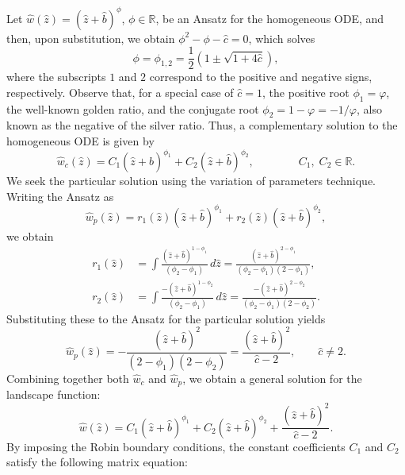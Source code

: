 \documentclass[symmetry,article,accept,moreauthors,pdftex,a4paper]{mdpi}
\begin{document}
\begin{paracol}{2}
Let $\widehat{w}(\widehat{z}) = (\widehat{z} + \widehat{b})^{\phi}$, $\phi \in \mathbb{R}$, be an Ansatz for the homogeneous ODE, and then, upon substitution, we obtain $\phi^2 - \phi - \widehat{c} = 0$, which solves
\begin{equation*}
\phi = \phi_{1,2} = \frac{1}{2} \left(1 \pm \sqrt{1 + 4 \widehat{c}} \right),
\end{equation*}
where the subscripts $1$ and $2$ correspond to the positive and negative signs, respectively. Observe that, for a special case of $\widehat{c} = 1$, the positive root $\phi_1 = \varphi$, the well-known golden ratio, and the conjugate root $\phi_2 = 1 - \varphi = -1/\varphi$, also known as the negative of the silver ratio. Thus, a complementary solution to the homogeneous ODE is given by
\begin{equation*}
\widehat{w}_c(\widehat{z}) = C_1 (\widehat{z} + \widehat{b})^{\phi_1} + C_2 (\widehat{z} + \widehat{b})^{\phi_2}, \qquad \qquad C_1, \; C_2 \in \mathbb{R}.
\end{equation*}
We seek the particular solution using the variation of parameters technique. Writing the Ansatz as 
\begin{equation*}
\widehat{w}_p(\widehat{z}) = r_1(\widehat{z}) (\widehat{z} + \widehat{b})^{\phi_1} + r_2(\widehat{z}) (\widehat{z} + \widehat{b})^{\phi_2},
\end{equation*}
we obtain
\begin{align*}
r_1(\widehat{z}) &= \int \frac{(\widehat{z} + \widehat{b})^{1 - \phi_1}}{(\phi_2 - \phi_1)} \, d\widehat{z} 
= \frac{(\widehat{z} + \widehat{b})^{2 - \phi_1}}{(\phi_2 - \phi_1)(2 - \phi_1)}, \\
r_2(\widehat{z}) &= \int \frac{-(\widehat{z} + \widehat{b})^{1 - \phi_2}}{(\phi_2 - \phi_1)} \, d\widehat{z} 
= \frac{-(\widehat{z} + \widehat{b})^{2 - \phi_2}}{(\phi_2 - \phi_1)(2 - \phi_2)}.
\end{align*}
Substituting these to the Ansatz for the particular solution yields
\begin{equation*}
\widehat{w}_p(\widehat{z}) = -\frac{(\widehat{z} + \widehat{b})^2}{(2 - \phi_1)(2 - \phi_2)} = \frac{(\widehat{z} + \widehat{b})^2}{\widehat{c} - 2}, \qquad \widehat{c} \neq 2.
\end{equation*}
Combining together both $\widehat{w}_c$ and $\widehat{w}_p$, we obtain a general solution for the landscape function:
\begin{equation*}
\widehat{w}(\widehat{z}) = C_1 (\widehat{z} + \widehat{b})^{\phi_1} + C_2 (\widehat{z} + \widehat{b})^{\phi_2} + \frac{(\widehat{z} + \widehat{b})^2}{\widehat{c} - 2}.
\end{equation*}
By imposing the Robin boundary conditions, the constant coefficients $C_1$ and $C_2$ satisfy the following matrix equation:
\end{paracol}
\end{document}

